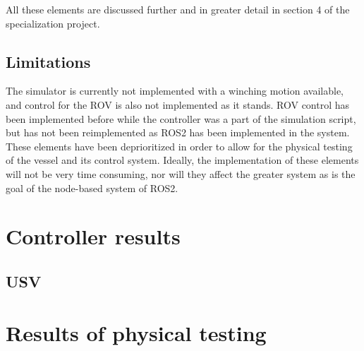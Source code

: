 \documentclass[class=article, crop=false]{standalone}
\begin{document}
All these elements are discussed further and in greater detail in section 4 of the specialization project.

\subsection{Limitations}
The simulator is currently not implemented with a winching motion available, and control for the ROV is also not implemented as it stands. ROV control has been implemented before while the controller was a part of the simulation script, but has not been reimplemented as ROS2 has been implemented in the system. These elements have been deprioritized in order to allow for the physical testing of the vessel and its control system. Ideally, the implementation of these elements will not be very time consuming, nor will they affect the greater system as is the goal of the node-based system of ROS2.

\section{Controller results}

\subsection{USV}



\section{Results of physical testing}
\end{document}
